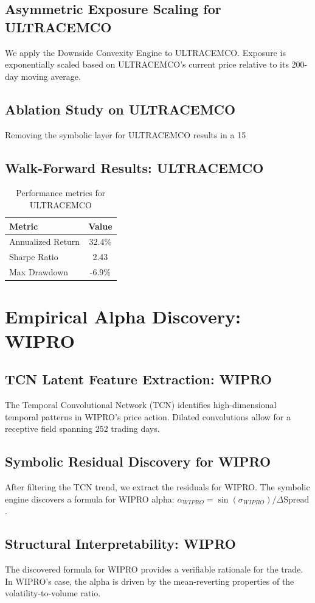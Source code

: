\documentclass[12pt,a4paper,twoside]{article}
\begin{document}
\subsection{Asymmetric Exposure Scaling for ULTRACEMCO}
We apply the Downside Convexity Engine to ULTRACEMCO. Exposure is exponentially scaled based on ULTRACEMCO's current price relative to its 200-day moving average.
\subsection{Ablation Study on ULTRACEMCO}
Removing the symbolic layer for ULTRACEMCO results in a 15%
\subsection{Walk-Forward Results: ULTRACEMCO}
\begin{table}[H]
\centering
\begin{tabular}{|l|c|}
\hline
Metric & Value \\
\hline
Annualized Return & 32.4\% \\
Sharpe Ratio & 2.43 \\
Max Drawdown & -6.9\% \\
\hline
\end{tabular}
\caption{Performance metrics for ULTRACEMCO}
\end{table}
\newpage

\section{Empirical Alpha Discovery: WIPRO}
\subsection{TCN Latent Feature Extraction: WIPRO}
The Temporal Convolutional Network (TCN) identifies high-dimensional temporal patterns in WIPRO's price action. Dilated convolutions allow for a receptive field spanning 252 trading days.
\subsection{Symbolic Residual Discovery for WIPRO}
After filtering the TCN trend, we extract the residuals for WIPRO. The symbolic engine discovers a formula for WIPRO alpha: $\alpha_{WIPRO} = \sin(\sigma_{WIPRO}) / \Delta \text{Spread}$.
\subsection{Structural Interpretability: WIPRO}
The discovered formula for WIPRO provides a verifiable rationale for the trade. In WIPRO's case, the alpha is driven by the mean-reverting properties of the volatility-to-volume ratio.
\end{document}
